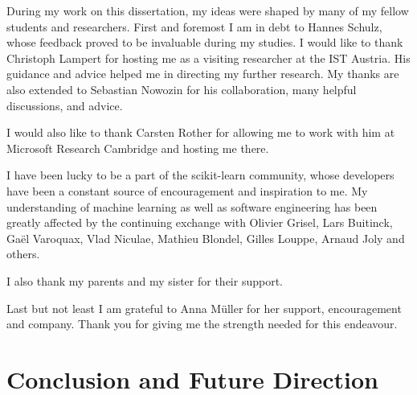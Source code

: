\documentclass[12pt,toc=bibnumbered, a4paper,twoside,DIV=11,BCOR=.5cm]{scrbook}
\begin{document}
During my work on this dissertation, my ideas were shaped by many of my fellow
students and researchers. First and foremost I am in debt to Hannes Schulz,
whose feedback proved to be invaluable during my studies.
I would like to thank Christoph Lampert for hosting me as a visiting researcher
at the IST Austria. His guidance and advice helped me in directing my further
research. My thanks are also extended to Sebastian Nowozin for his collaboration,
many helpful discussions, and advice.

I would also like to thank Carsten Rother for allowing me to work with him
at Microsoft Research Cambridge and hosting me there.

I have been lucky to be a part of the scikit-learn community, whose developers
have been a constant source of encouragement and inspiration to me. My
understanding of machine learning as well as software engineering has been
greatly affected by the continuing exchange with Olivier Grisel, Lars Buitinck,
Ga\"el Varoquax, Vlad Niculae, Mathieu Blondel, Gilles Louppe, Arnaud Joly and
others.

I also thank my parents and my sister for their support.

Last but not least I am grateful to Anna M\"uller for her support,
encouragement and company. Thank you for giving me the strength needed for this
endeavour.
\cleardoublepage
{}


%














\chapter{Conclusion and Future Direction}
\end{document}
